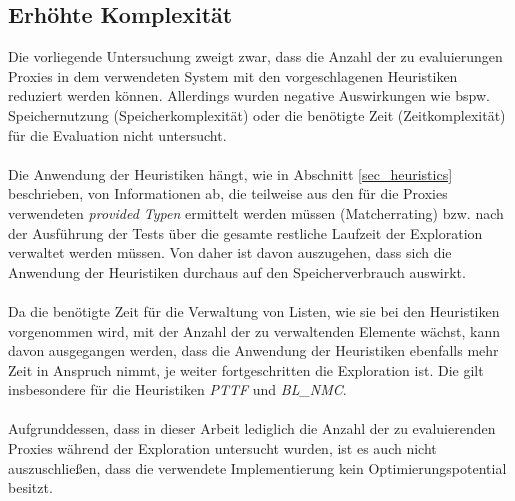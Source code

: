 \subsection{Erhöhte Komplexität}
Die vorliegende Untersuchung zweigt zwar, dass die Anzahl der zu evaluierungen Proxies in dem verwendeten System mit den vorgeschlagenen Heuristiken reduziert werden können. Allerdings wurden negative Auswirkungen wie bspw. Speichernutzung (Speicherkomplexität) oder die benötigte Zeit  (Zeitkomplexität) für die Evaluation nicht untersucht.
\\\\
Die Anwendung der Heuristiken hängt, wie in Abschnitt \ref{sec_heuristics} beschrieben, von Informationen ab, die teilweise aus den für die Proxies verwendeten \emph{provided Typen} ermittelt werden müssen (Matcherrating) bzw. nach der Ausführung der Tests über die gesamte restliche Laufzeit der Exploration verwaltet werden müssen. Von daher ist davon auszugehen, dass sich die Anwendung der Heuristiken durchaus auf den Speicherverbrauch auswirkt.
\\\\
Da die benötigte Zeit für die Verwaltung von Listen, wie sie bei den Heuristiken vorgenommen wird, mit der Anzahl der zu verwaltenden Elemente wächst, kann davon ausgegangen werden, dass die Anwendung der Heuristiken ebenfalls mehr Zeit in Anspruch nimmt, je weiter fortgeschritten die Exploration ist. Die gilt insbesondere für die Heuristiken \emph{PTTF} und \emph{BL\_NMC}. 
\\\\
Aufgrunddessen, dass in dieser Arbeit lediglich die Anzahl der zu evaluierenden Proxies während der Exploration untersucht wurden, ist es auch nicht auszuschließen, dass die verwendete Implementierung kein Optimierungspotential besitzt.


